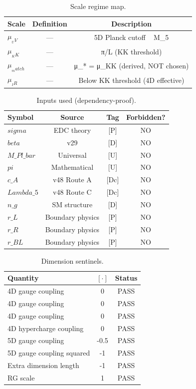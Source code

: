 \begin{table}[ht]
\centering
\caption{Scale regime map.}
\label{tab:scale-map}
\begin{tabular}{lcc}
\toprule
Scale & Definition & Description \\
\midrule
$\mu_{_UV}$ & — & 5D Planck cutoff ~ M_5 \\
$\mu_{_KK}$ & — & π/L (KK threshold) \\
$\mu_{_match}$ & — & μ_* = μ_KK (derived, NOT chosen) \\
$\mu_{_IR}$ & — & Below KK threshold (4D effective) \\
\bottomrule
\end{tabular}
\end{table}

\begin{table}[ht]
\centering
\caption{Inputs used (dependency-proof).}
\label{tab:inputs-used}
\begin{tabular}{lccc}
\toprule
Symbol & Source & Tag & Forbidden? \\
\midrule
$sigma$ & EDC theory & [P] & NO \\
$beta$ & v29 & [D] & NO \\
$M\_Pl\_bar$ & Universal & [U] & NO \\
$pi$ & Mathematical & [U] & NO \\
$c\_A$ & v48 Route A & [Dc] & NO \\
$Lambda\_5$ & v48 Route C & [Dc] & NO \\
$n\_g$ & SM structure & [D] & NO \\
$r\_L$ & Boundary physics & [P] & NO \\
$r\_R$ & Boundary physics & [P] & NO \\
$r\_BL$ & Boundary physics & [P] & NO \\
\bottomrule
\end{tabular}
\end{table}

\begin{table}[ht]
\centering
\caption{Dimension sentinels.}
\label{tab:dim-sentinels}
\begin{tabular}{lcc}
\toprule
Quantity & $[\cdot]$ & Status \\
\midrule
4D gauge coupling & 0 & PASS \\
4D gauge coupling & 0 & PASS \\
4D gauge coupling & 0 & PASS \\
4D hypercharge coupling & 0 & PASS \\
5D gauge coupling & -0.5 & PASS \\
5D gauge coupling squared & -1 & PASS \\
Extra dimension length & -1 & PASS \\
RG scale & 1 & PASS \\
\bottomrule
\end{tabular}
\end{table}
